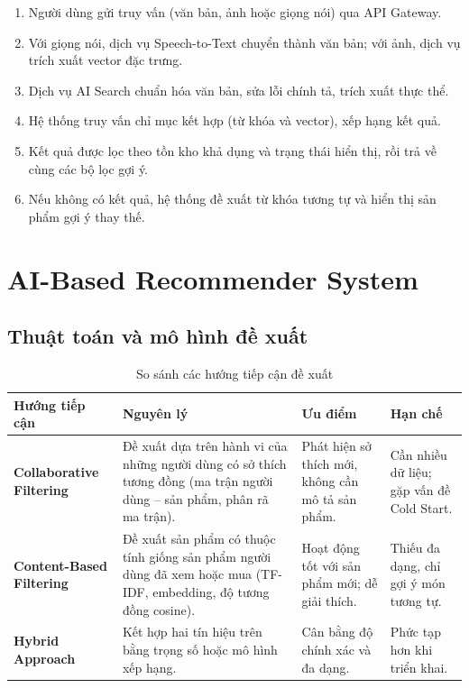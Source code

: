 \documentclass[12pt,a4paper,oneside]{report}
\begin{document}
\begin{enumerate}
  \item Người dùng gửi truy vấn (văn bản, ảnh hoặc giọng nói) qua API Gateway.
  \item Với giọng nói, dịch vụ Speech-to-Text chuyển thành văn bản; với ảnh, dịch vụ trích xuất vector đặc trưng.
  \item Dịch vụ AI Search chuẩn hóa văn bản, sửa lỗi chính tả, trích xuất thực thể.
  \item Hệ thống truy vấn chỉ mục kết hợp (từ khóa và vector), xếp hạng kết quả.
  \item Kết quả được lọc theo tồn kho khả dụng và trạng thái hiển thị, rồi trả về cùng các bộ lọc gợi ý.
  \item Nếu không có kết quả, hệ thống đề xuất từ khóa tương tự và hiển thị sản phẩm gợi ý thay thế.
\end{enumerate}

\section{AI-Based Recommender System}

\subsection{Thuật toán và mô hình đề xuất}

\begin{longtable}{p{3.4cm}p{5.8cm}p{3.4cm}p{3cm}}
\caption{So sánh các hướng tiếp cận đề xuất}\\
\toprule
\textbf{Hướng tiếp cận} & \textbf{Nguyên lý} & \textbf{Ưu điểm} & \textbf{Hạn chế} \\
\midrule
\endhead
\bottomrule
\endlastfoot
\textbf{Collaborative Filtering} & Đề xuất dựa trên hành vi của những người dùng có sở thích tương đồng (ma trận người dùng -- sản phẩm, phân rã ma trận). & Phát hiện sở thích mới, không cần mô tả sản phẩm. & Cần nhiều dữ liệu; gặp vấn đề Cold Start. \\
\textbf{Content-Based Filtering} & Đề xuất sản phẩm có thuộc tính giống sản phẩm người dùng đã xem hoặc mua (TF-IDF, embedding, độ tương đồng cosine). & Hoạt động tốt với sản phẩm mới; dễ giải thích. & Thiếu đa dạng, chỉ gợi ý món tương tự. \\
\textbf{Hybrid Approach} & Kết hợp hai tín hiệu trên bằng trọng số hoặc mô hình xếp hạng. & Cân bằng độ chính xác và đa dạng. & Phức tạp hơn khi triển khai. \\
\end{longtable}
\end{document}
